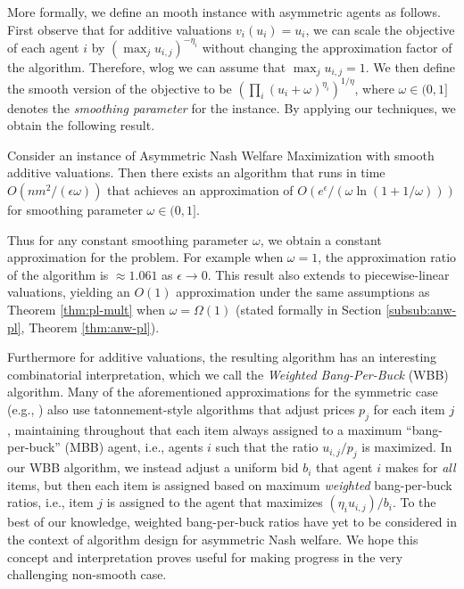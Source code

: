 More formally, we define an mooth instance with asymmetric agents as follows. First observe that for additive valuations $v_i(u_i) = u_i$, we can scale the objective of each agent $i$ by $(\max_j u_{i,j})^{-\eta_i}$ without changing the approximation factor of the algorithm. 
Therefore, wlog we can assume that $\max_{j}u_{i,j} = 1$. We then define the smooth version of the objective to be $\left(\prod_i (u_i + \omega )^{\eta_i}\right)^{1/\eta}$, where $\omega \in (0,1]$ denotes the {\em smoothing parameter} for the instance. By applying our techniques, we obtain the following result.

\begin{theorem}
\label{thm:snsw}
Consider an instance of Asymmetric  Nash Welfare Maximization with smooth additive valuations. Then there exists an algorithm that runs in time $O(nm^2/(\epsilon \omega))$ that achieves an approximation of $O(e^{\epsilon}/(\omega\ln(1+1/\omega)))$ for smoothing parameter $\omega \in (0,1]$. 
\end{theorem}

Thus for any constant smoothing parameter $\omega$, we obtain a constant approximation for the problem. For example when $\omega = 1$, the approximation ratio of the algorithm is $\approx 1.061$ as $\epsilon \rightarrow 0$. This result also extends to piecewise-linear valuations, yielding an $O(1)$ approximation under the same assumptions as Theorem \ref{thm:pl-mult} when $\omega = \Omega(1)$ (stated formally in Section \ref{subsub:anw-pl}, Theorem \ref{thm:anw-pl}).


Furthermore for additive valuations, the resulting algorithm has an interesting combinatorial interpretation, 
which we call the {\em Weighted Bang-Per-Buck} (WBB) algorithm. 
Many of the aforementioned approximations for the symmetric case (e.g., \cite{anari2018nash, barman2018finding, chaudhury2018fair, garg2018approximating}) also use tatonnement-style algorithms that adjust prices $p_j$ for each item $j$, maintaining throughout that
each item always assigned to a maximum ``bang-per-buck'' (MBB) agent, i.e., agents $i$ such that the ratio $u_{i,j}/p_j$ is maximized. 
In our WBB algorithm, we instead adjust a uniform bid $b_i$ that agent $i$ makes for {\em all} items, but then each item is assigned based on maximum {\em weighted} bang-per-buck ratios, i.e., item $j$ is assigned to the agent that maximizes $(\eta_i u_{i,j})/b_i$. To the best of our knowledge, weighted bang-per-buck ratios have yet to be considered in the context of algorithm design for asymmetric Nash welfare. We hope this concept and interpretation proves useful for making progress in the very challenging non-smooth case. 

